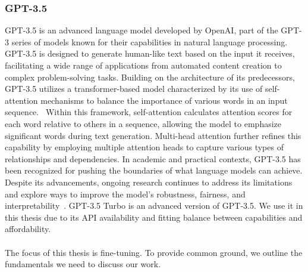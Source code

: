 \subsubsection*{GPT-3.5}\label{sec:gpt3.5}
GPT-3.5 is an advanced language model developed by OpenAI, part of the GPT-3 series of models known for their capabilities in natural language processing. GPT-3.5 is designed to generate human-like text based on the input it receives, facilitating a wide range of applications from automated content creation to complex problem-solving tasks. Building on the architecture of its predecessors, GPT-3.5 utilizes a transformer-based model characterized by its use of self-attention mechanisms to balance the importance of various words in an input sequence.~\cite{latif_fine-tuning_2024} Within this framework, self-attention calculates attention scores for each word relative to others in a sequence, allowing the model to emphasize significant words during text generation. Multi-head attention further refines this capability by employing multiple attention heads to capture various types of relationships and dependencies. In academic and practical contexts, GPT-3.5 has been recognized for pushing the boundaries of what language models can achieve. Despite its advancements, ongoing research continues to address its limitations and explore ways to improve the model's robustness, fairness, and interpretability~\cite {brown_language_2020}. GPT-3.5 Turbo is an advanced version of GPT-3.5. We use it in this thesis due to its API availability and fitting balance between capabilities and affordability.\\\\
The focus of this thesis is fine-tuning. To provide common ground, we outline the fundamentals we need to discuss our work.

